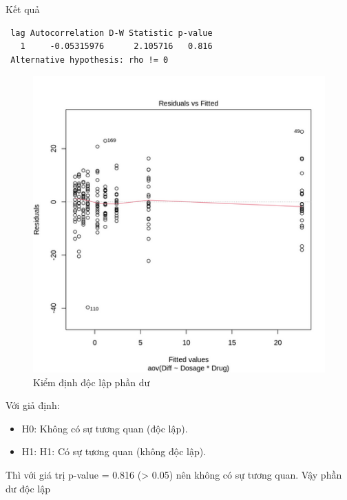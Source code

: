 Kết quả 
\begin{lstlisting}
 lag Autocorrelation D-W Statistic p-value
   1     -0.05315976      2.105716   0.816
 Alternative hypothesis: rho != 0

\end{lstlisting}
\begin{figure}[H]
    \centering
    \includegraphics[width=0.8\linewidth]{part01_figures/7.png}
    \caption{Kiểm định độc lập phần dư}
    \label{fig:Kiểm định độc lập phần dư}
\end{figure}
Với giả định:
\begin{itemize}
    \item H0: Không có sự tương quan (độc lập).
    \item H1: H1: Có sự tương quan (không độc lập).
\end{itemize}

Thì với giá trị p-value = 0.816 (> 0.05) nên không có sự tương quan. Vậy phần dư độc lập

